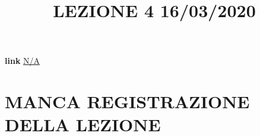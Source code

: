 \title{LEZIONE 4 16/03/2020}\newline
\textbf{link} \href{}{N/A}
\section*{MANCA REGISTRAZIONE DELLA LEZIONE}